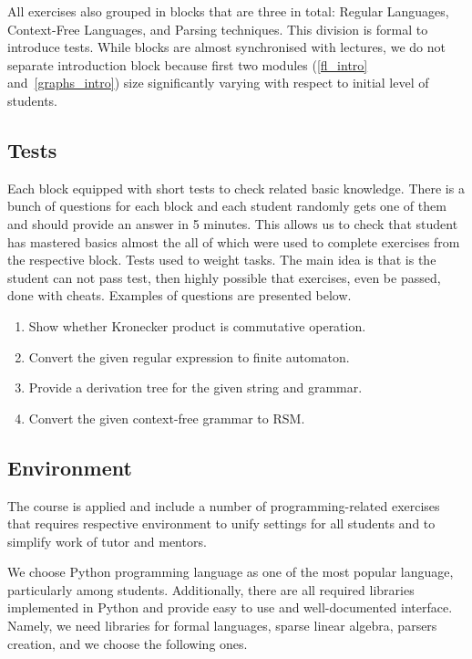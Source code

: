 \documentclass[sigconf]{acmart}
\begin{document}
All exercises also grouped in blocks that are three in total: Regular Languages, Context-Free Languages, and Parsing techniques.
This division is formal to introduce tests.
While blocks are almost synchronised with lectures, we do not separate introduction block because first two modules (\ref{fl_intro} and~\ref{graphs_intro}) size significantly varying with respect to initial level of students.


\subsection{Tests}

Each block equipped with short tests to check related basic knowledge.
There is a bunch of questions for each block and each student randomly gets one of them and should provide an answer in 5 minutes. 
This allows us to check that student has mastered basics almost the all of which were used to complete exercises from the respective block.
Tests used to weight tasks.
The main idea is that is the student can not pass test, then highly possible that exercises, even be passed, done with cheats.
Examples of questions are presented below.
\begin{enumerate}
   \item Show whether Kronecker product is commutative operation. 
   \item Convert the given regular expression to finite automaton.
   \item Provide a derivation tree for the given string and grammar.
   \item Convert the given context-free grammar to RSM.
\end{enumerate}


\subsection{Environment}

The course is applied and include a number of programming-related exercises that requires respective environment to unify settings for all students and to simplify work of tutor and mentors.

We choose Python programming language as one of the most popular language, particularly among students.
Additionally, there are all required libraries implemented in Python and provide easy to use and well-documented interface.
Namely, we need libraries for formal languages, sparse linear algebra, parsers creation, and we choose the following ones.
\end{document}
